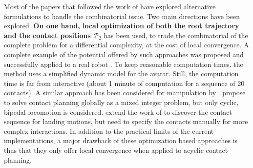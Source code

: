 Most of the papers that followed the work of \citeauthor{Bretl:2006:MPM:1124573.1124585} have explored alternative formulations to handle the combinatorial issue. Two main directions have been explored. \textbf{On one hand, local optimization of both the root trajectory \Pa and the contact positions $\mathcal{P}_2$} has been used, to trade the combinatorial of the complete problem for a differential complexity, at the cost of local convergence. A complete example of the potential offered by such approaches was proposed \citep{Mordatch:2012:DCB:2185520.2185539} and successfully applied to a real robot \citep{mordatch2015}. To keep reasonable computation times, the method uses a simplified dynamic model for the avatar. Still, the computation time is far from interactive  (about 1 minute of computation for a sequence of 20 contacts).  A similar approach has been considered for manipulation by \cite{gabicciniisrr15}. \citeauthor{DBLP:conf/humanoids/DeitsT14} propose to solve contact planning globally as a mixed integer problem, but only cyclic, bipedal locomotion is considered. 
\citeauthor{dai2014whole} extend the work of \citeauthor{Posa:2014:DMT:2568343.2568352} to discover the contact sequence for landing motions, but need to specify
the contacts manually for more complex interactions.
In addition to the practical limits of the current implementations, a major drawback of these optimization based approaches is thus that they only offer local convergence when applied to acyclic contact planning.

